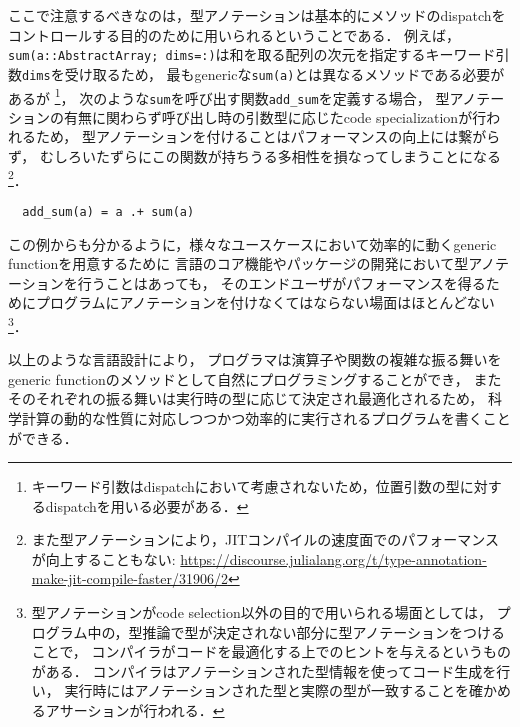 ここで注意するべきなのは，型アノテーションは基本的にメソッドのdispatchをコントロールする目的のために用いられるということである．
例えば，\verb|sum(a::AbstractArray; dims=:)|は和を取る配列の次元を指定するキーワード引数\verb|dims|を受け取るため，
最もgenericな\verb|sum(a)|とは異なるメソッドである必要があるが
\footnote{
  キーワード引数はdispatchにおいて考慮されないため，位置引数の型に対するdispatchを用いる必要がある．
}，
次のような\verb|sum|を呼び出す関数\verb|add_sum|を定義する場合，
型アノテーションの有無に関わらず呼び出し時の引数型に応じたcode specializationが行われるため，
型アノテーションを付けることはパフォーマンスの向上には繋がらず，
むしろいたずらにこの関数が持ちうる多相性を損なってしまうことになる
\footnote{
  また型アノテーションにより，JITコンパイルの速度面でのパフォーマンスが向上することもない:
  \url{https://discourse.julialang.org/t/type-annotation-make-jit-compile-faster/31906/2}
}．

\begin{verbatim}
  add_sum(a) = a .+ sum(a)
\end{verbatim}

この例からも分かるように，様々なユースケースにおいて効率的に動くgeneric functionを用意するために
言語のコア機能やパッケージの開発において型アノテーションを行うことはあっても，
そのエンドユーザがパフォーマンスを得るためにプログラムにアノテーションを付けなくてはならない場面はほとんどない
\footnote{
  型アノテーションがcode selection以外の目的で用いられる場面としては，
  プログラム中の，型推論で型が決定されない部分に型アノテーションをつけることで，
  コンパイラがコードを最適化する上でのヒントを与えるというものがある\cite{type-annotation}．
  コンパイラはアノテーションされた型情報を使ってコード生成を行い，
  実行時にはアノテーションされた型と実際の型が一致することを確かめるアサーションが行われる．
}．

以上のような言語設計により，
プログラマは演算子や関数の複雑な振る舞いをgeneric functionのメソッドとして自然にプログラミングすることができ\footnotemark，
またそのそれぞれの振る舞いは実行時の型に応じて決定され最適化されるため，
科学計算の動的な性質に対応しつつかつ効率的に実行されるプログラムを書くことができる．


